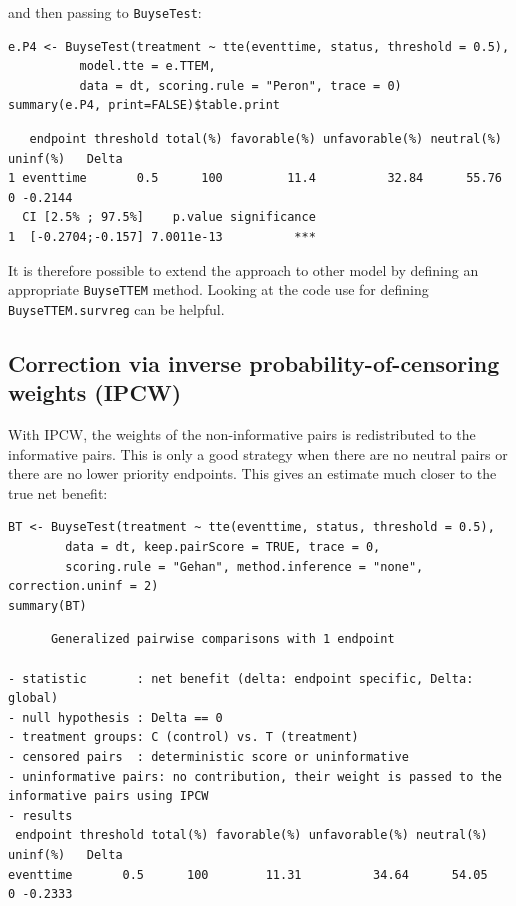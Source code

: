 \documentclass[12pt]{article}
\begin{document}
and then passing to \texttt{BuyseTest}:
\lstset{language=r,label= ,caption= ,captionpos=b,numbers=none}
\begin{lstlisting}
e.P4 <- BuyseTest(treatment ~ tte(eventtime, status, threshold = 0.5),
		  model.tte = e.TTEM,
		  data = dt, scoring.rule = "Peron", trace = 0)
summary(e.P4, print=FALSE)$table.print
\end{lstlisting}

\begin{verbatim}
   endpoint threshold total(%) favorable(%) unfavorable(%) neutral(%) uninf(%)   Delta
1 eventtime       0.5      100         11.4          32.84      55.76        0 -0.2144
  CI [2.5% ; 97.5%]    p.value significance
1  [-0.2704;-0.157] 7.0011e-13          ***
\end{verbatim}


It is therefore possible to extend the approach to other model by
defining an appropriate \texttt{BuyseTTEM} method. Looking at the code use
for defining \texttt{BuyseTTEM.survreg} can be helpful.

\subsection{Correction via inverse probability-of-censoring weights (IPCW)}
\label{sec:org6acaeea}

With IPCW, the weights of the non-informative pairs is redistributed
to the informative pairs. This is only a good strategy when there are
no neutral pairs or there are no lower priority endpoints. This gives
an estimate much closer to the true net benefit:
\lstset{language=r,label= ,caption= ,captionpos=b,numbers=none}
\begin{lstlisting}
BT <- BuyseTest(treatment ~ tte(eventtime, status, threshold = 0.5),
		data = dt, keep.pairScore = TRUE, trace = 0,
		scoring.rule = "Gehan", method.inference = "none", correction.uninf = 2)
summary(BT)
\end{lstlisting}

\begin{verbatim}
      Generalized pairwise comparisons with 1 endpoint

- statistic       : net benefit (delta: endpoint specific, Delta: global) 
- null hypothesis : Delta == 0 
- treatment groups: C (control) vs. T (treatment) 
- censored pairs  : deterministic score or uninformative
- uninformative pairs: no contribution, their weight is passed to the informative pairs using IPCW
- results
 endpoint threshold total(%) favorable(%) unfavorable(%) neutral(%) uninf(%)   Delta
eventtime       0.5      100        11.31          34.64      54.05        0 -0.2333
\end{verbatim}
\end{document}
